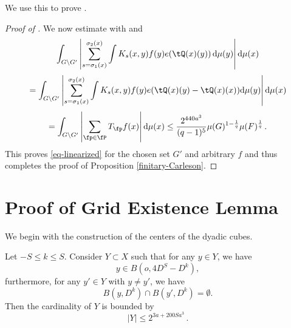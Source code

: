 We use this to prove .
\begin{proof}[Proof of ]
\leanok
We now estimate with  and 
\begin{equation}
 \int_{G \setminus G'} \left|\sum_{s={\sigma_1}(x)}^{{\sigma_2}(x)} \int K_s(x,y) f(y) e(\tQ(x)(y)) \, \mathrm{d}\mu(y)\right| \mathrm{d}\mu(x)
\end{equation}
\begin{equation}
 =\int_{G \setminus G'} \left|\sum_{s={\sigma_1}(x)}^{{\sigma_2}(x)} \int K_s(x,y) f(y) e(\tQ(x)(y) - \tQ(x)(x))\mathrm{d}\mu(y)\right| \mathrm{d}\mu(x)
\end{equation}
\begin{equation}
 =\int_{G \setminus G'} \left|\sum_{\fp\in \fP}T_{\fp} f(x)\right| \mathrm{d}\mu(x)
 \le \frac{2^{440a^3}}{(q-1)^5} \mu(G)^{1 - \frac{1}{q}} \mu(F)^{\frac{1}{q}} \,.
\end{equation}
This proves \eqref{eq-linearized} for the chosen set $G'$ and arbitrary $f$ and thus completes the proof of Proposition
\ref{finitary-Carleson}.
\end{proof}


\section{Proof of Grid Existence Lemma}
\label{subsecdyadic}

We begin with the construction of the centers of the dyadic cubes.
\begin{lemma}
    \label{counting-balls}
    \leanok
    Let $-S\le k\le S$. Consider $Y\subset X$ such that for any $y\in Y$, we have
    \begin{equation}\label{ybinb}
    y\in B(o,4D^S-D^k),
    \end{equation}
    furthermore, for any $y'\in Y$ with $y\neq y'$, we have
    \begin{equation} \label{eq-disj-yballs}
        B(y,D^k)\cap B(y',D^k)=\emptyset.
    \end{equation}
    Then the cardinality of $Y$ is bounded by
    \begin{equation}\label{boundY}
        |Y|\le 2^{3a + 200Sa^3}\, .
    \end{equation}
\end{lemma}


